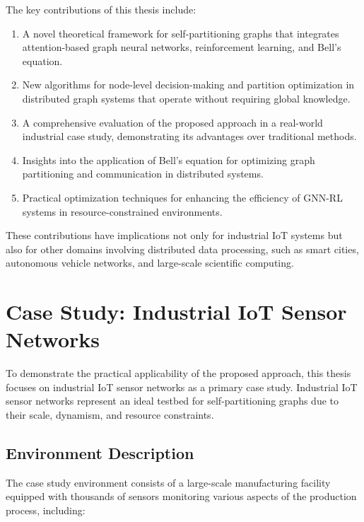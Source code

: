 \documentclass{article}
\begin{document}
The key contributions of this thesis include:

\begin{enumerate}
    \item A novel theoretical framework for self-partitioning graphs that integrates attention-based graph neural networks, reinforcement learning, and Bell's equation.
    
    \item New algorithms for node-level decision-making and partition optimization in distributed graph systems that operate without requiring global knowledge.
    
    \item A comprehensive evaluation of the proposed approach in a real-world industrial case study, demonstrating its advantages over traditional methods.
    
    \item Insights into the application of Bell's equation for optimizing graph partitioning and communication in distributed systems.
    
    \item Practical optimization techniques for enhancing the efficiency of GNN-RL systems in resource-constrained environments.
\end{enumerate}

These contributions have implications not only for industrial IoT systems but also for other domains involving distributed data processing, such as smart cities, autonomous vehicle networks, and large-scale scientific computing.

\section{Case Study: Industrial IoT Sensor Networks}

To demonstrate the practical applicability of the proposed approach, this thesis focuses on industrial IoT sensor networks as a primary case study. Industrial IoT sensor networks represent an ideal testbed for self-partitioning graphs due to their scale, dynamism, and resource constraints.

\subsection{Environment Description}

The case study environment consists of a large-scale manufacturing facility equipped with thousands of sensors monitoring various aspects of the production process, including:
\end{document}
